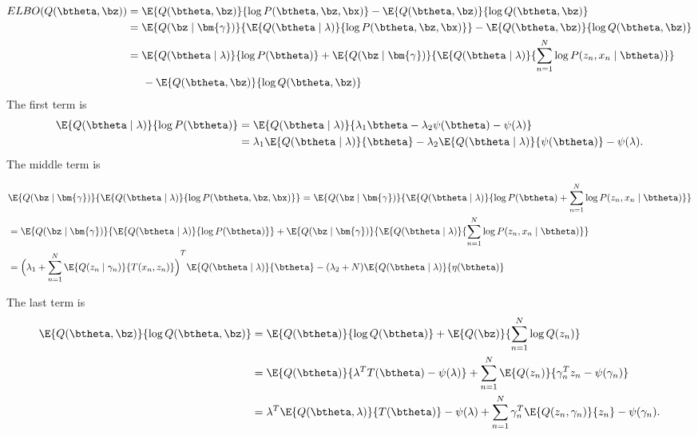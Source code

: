 \[
  \begin{aligned}
   ELBO(Q(\btheta, \bz)) &= \E{Q(\btheta, \bz)}{\log{P(\btheta, \bz, \bx)}} - \E{Q(\btheta, \bz)}{\log{Q(\btheta, \bz)}}\\
  &= \E{Q(\bz \mid \bm{\gamma})}{\E{Q(\btheta \mid \lambda)}{\log P(\btheta, \bz, \bx)}}- \E{Q(\btheta, \bz)}{\log{Q(\btheta, \bz)}}\\
  &=  \E{Q(\btheta \mid \lambda)}{\log P(\btheta)} + \E{Q(\bz \mid \bm{\gamma})}{\E{Q(\btheta \mid \lambda)}{\sum_{n=1}^{N} \log P(z_{n}, x_{n} \mid \btheta)}}\\
  &\hspace{0.5cm} - \E{Q(\btheta, \bz)}{\log{Q(\btheta, \bz)}}
  \end{aligned}
\]
The first term is
\[
  \begin{aligned}
  \E{Q(\btheta \mid \lambda)}{\log P(\btheta)} &=  \E{Q(\btheta \mid \lambda)}{ \lambda_{1}\btheta - \lambda_{2}\psi(\btheta) - \psi(\lambda) }\\
  &= \lambda_{1}  \E{Q(\btheta \mid \lambda)}{\btheta} - \lambda_{2}\E{Q(\btheta \mid \lambda)}{\psi(\btheta)} - \psi(\lambda).
  \end{aligned}
\]
The middle term is 

\[
 \begin{aligned}
    &\E{Q(\bz \mid \bm{\gamma})}{\E{Q(\btheta \mid \lambda)}{\log P(\btheta, \bz, \bx)}} =  \E{Q(\bz \mid \bm{\gamma})}{\E{Q(\btheta \mid \lambda)}{\log P(\btheta) + \sum_{n=1}^{N} \log P(z_{n}, x_{n} \mid \btheta)}}\\
    &= \E{Q(\bz \mid \bm{\gamma})}{\E{Q(\btheta \mid \lambda)}{\log P(\btheta)}} + \E{Q(\bz \mid \bm{\gamma})}{\E{Q(\btheta \mid \lambda)}{\sum_{n=1}^{N} \log P(z_{n}, x_{n} \mid \btheta)}}\\
    &= {\Big( \lambda_{1} + \sum_{n=1}^{N} \E{Q(z_{n}\mid \gamma_{n})}{T(x_{n},z_{n})}\Big)}^{T}\E{Q(\btheta \mid \lambda)}{\btheta} - (\lambda_{2} + N) \E{Q(\btheta \mid \lambda)}{\eta(\btheta)}
 \end{aligned}
\]

The last term is
\[
  \begin{aligned}
  \E{Q(\btheta, \bz)}{\log{Q(\btheta, \bz)}}  &= \E{Q(\btheta)}{\log Q(\btheta)} +  \E{Q(\bz)}{ \sum_{n=1}^{N} \log Q(z_{n})}\\
  &= \E{Q(\btheta)}{\lambda^{T}T(\btheta) - \psi(\lambda)} + \sum_{n=1}^{N} \E{Q(z_{n})}{\gamma_{n}^{T}z_{n} - \psi(\gamma_{n})}\\
  &= \lambda ^{T} \E{Q(\btheta, \lambda)}{T(\btheta)} - \psi(\lambda) + \sum_{n=1}^{N}\gamma_{n}^{T}\E{Q(z_{n}, \gamma_{n})}{z_{n}} - \psi(\gamma_{n}).
  \end{aligned}
\]

